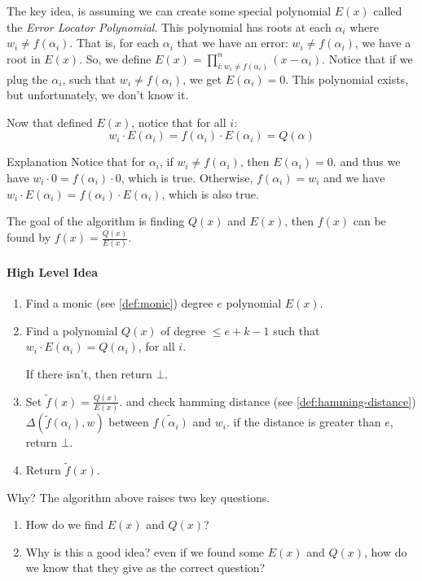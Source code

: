 The key idea, is assuming we can create some special polynomial $E(x)$ called
 the \emph{Error Locator Polynomial}.
This polynomial has roots at each $\alpha_i$ where $w_i\ne f(\alpha_i)$. That is, 
for each $\alpha_i$  that we have an error: $w_i\ne f(\alpha_i)$, we have a root in $E(x)$.
So, we define $ E(x) = \prod_{i:w_i\ne f(\alpha_i)}^{n} (x-\alpha_i)$.
Notice that if we plug the $\alpha_i$, such that $w_i\ne f(\alpha_i)$,
 we get $E(\alpha_i)=0$.
This polynomial exists, but unfortunately, we don't know it. 

Now that defined $E(x)$, notice that for all $i$:
$$ w_i\cdot E(\alpha_i) = f(\alpha_i)\cdot E(\alpha_i)= Q(\alpha)$$


\begin{bclogo}[logo=\bcinfo,noborder=true]{Explanation}
    Notice that for $\alpha_i$, if $w_i\ne f(\alpha_i)$, then $E(\alpha_i)=0$.
    and thus we have $w_i\cdot 0 = f(\alpha_i)\cdot 0$, which is true.
    Otherwise, $f(\alpha_i)=w_i$ and we have
     $w_i\cdot E(\alpha_i) = f(\alpha_i)\cdot E(\alpha_i)$, which is also true.
\end{bclogo}

The goal of the algorithm is finding $Q(x)$ and $E(x)$,
 then $f(x)$ can be found by $f(x)=\frac{Q(x)}{E(x)}$.

\paragraph{High Level Idea}
\begin{enumerate}
    \item Find a monic (see \autoref{def:monic}) degree $e$ polynomial $E(x)$.
    \item Find a polynomial $Q(x)$ of degree $\le e+k-1$ such 
    that $w_i\cdot E(\alpha_i)=Q(\alpha_i)$, for all $i$.

    If there isn't, then return $\bot$.
    \item Set $\tilde{f}(x)=\frac{Q(x)}{E(x)}$. and check hamming distance 
    (see \autoref{def:hamming-distance}) $\Delta(\tilde{f}(\alpha_i),w)$ 
    between $\tilde{f(\alpha_i)}$ and $w_i$.
    if the distance is greater than $e$, return $\bot$.
    \item Return $\tilde{f}(x)$.
\end{enumerate}


\begin{bclogo}[logo=\bcquestion]{Why?}
    The algorithm above raises two key questions.
    \begin{enumerate}
        \item How do we find $E(x)$ and $Q(x)$?
        \item Why is this a good idea? even if we found some $E(x)$ and $Q(x)$, 
        how do we know that they give as the correct question?
    \end{enumerate}    
\end{bclogo}


